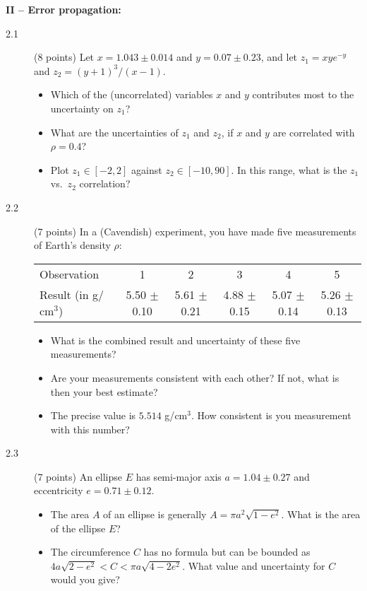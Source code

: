 \documentclass[11pt]{article}
\begin{document}
\vspace{2ex}
\noindent
{\bf II -- Error propagation:}
\begin{description}
\item[2.1] (8 points)
  Let $x = 1.043 \pm 0.014$ and $y = 0.07 \pm 0.23$, and let $z_1 = xy e^{-y}$ and $z_2 = (y+1)^{3}/(x \!-\! 1)$.
  \vspace*{-1ex}
  \begin{itemize}
    \item Which of the (uncorrelated) variables $x$ and $y$ contributes most to the uncertainty on $z_1$?
    \item What are the uncertainties of $z_1$ and $z_2$, if $x$ and $y$ are correlated with $\rho = 0.4$?
    \item Plot $z_1 \in [-2,2]$ against $z_2 \in [-10,90]$. In this range, what is the $z_1$ vs.\ $z_2$ correlation?
  \end{itemize}
%
\item[2.2] (7 points)
  In a (Cavendish) experiment, you have made five measurements of Earth's density $\rho$:\\[-1ex]
  \vspace*{-3ex}
  \begin{center}
  \begin{tabular}{lccccc}
    \hline
    Observation                   &1                &2                 &3                &4                &5\\
    Result (in g/$\mbox{cm}^3$)   &5.50 $\pm$ 0.10  &5.61 $\pm$ 0.21   &4.88 $\pm$ 0.15  &5.07 $\pm$ 0.14  &5.26 $\pm$ 0.13\\
    \hline
  \end{tabular}
  \end{center}
  \vspace*{-3ex}
  \begin{itemize}
    \item What is the combined result and uncertainty of these five measurements?
    \item Are your measurements consistent with each other? If not, what is then your best estimate?
    \item The precise value is $5.514$ g/$\mbox{cm}^3$. How consistent is you measurement with this number?
  \end{itemize}
%
\item[2.3] (7 points)
  An ellipse $E$ has semi-major axis $a = 1.04 \pm 0.27$ and eccentricity $e = 0.71 \pm 0.12$.
  \vspace*{-1ex}
  \begin{itemize}
    \item The area $A$ of an ellipse is generally $A = \pi a^2 \sqrt{1 - e^2}$. What is the area of the ellipse $E$?
    \item The circumference $C$ has no formula but can be bounded as $4a \sqrt{2-e^2} < C < \pi a \sqrt{4-2e^2}$.
      What value and uncertainty for $C$ would you give?
  \end{itemize}
\end{description}
\end{document}
